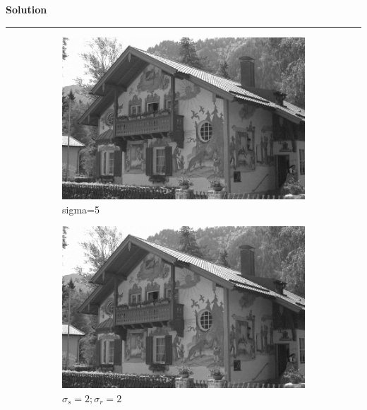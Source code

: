 \documentclass[a4paper]{article}
\newenvironment{solution}[2][]{%
    \begin{mdframed}[linecolor=green!60!black, linewidth=2pt, roundcorner=10pt, backgroundcolor=green!5!white, skipabove=12pt, skipbelow=12pt]%
        \textbf{\large #2} %
        \par\noindent\rule{\textwidth}{0.4pt} %
        \vspace{0.5em} %
}{%
    \end{mdframed}%
}
\begin{document}
\begin{solution}{Solution}
\begin{figure}[H]
    \centering
    \begin{subfigure}[b]{0.24\textwidth}
        \centering
        \includegraphics[width=\textwidth]{../images/noisy_kodak24_sigma_5.png}
        \caption{sigma=5}
        \label{Noisy }
    \end{subfigure}
    \begin{subfigure}[b]{0.24\textwidth}
        \centering
        \includegraphics[width=\textwidth]{../images/filtered_kodak24_meanshift_sigma_5_sigma_s_2_sigma_r_2.png}
        \caption{$\sigma_s=2;\sigma_r=2$}
        \label{fig:subfig2}
    \end{subfigure}
    \begin{subfigure}[b]{0.24\textwidth}
        \centering

\end{subfigure}
\end{figure}
\end{solution}
\end{document}
